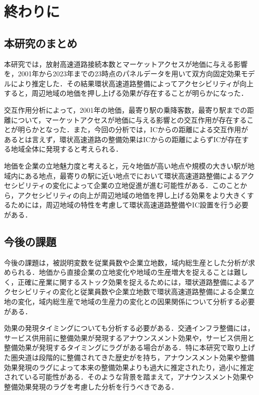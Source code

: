\chapter{終わりに}

\section{本研究のまとめ}
本研究では，放射高速道路接続本数とマーケットアクセスが地価に与える影響を，2001年から2023年までの23時点のパネルデータを用いて双方向固定効果モデルにより推定した．その結果環状高速道路整備によってアクセシビリティが向上すると，周辺地域の地価を押し上げる効果が存在することが明らかになった．

交互作用分析によって，2001年の地価，最寄り駅の乗降客数，最寄り駅までの距離について，マーケットアクセスが地価に与える影響との交互作用が存在することが明らかとなった．また，今回の分析では，ICからの距離による交互作用があるとは言えず，環状高速道路の整備効果はICからの距離によらずICが存在する地域全体に発現すると考えられる．

地価を企業の立地魅力度と考えると，元々地価が高い地点や規模の大きい駅が地域内にある地点，最寄りの駅に近い地点でにおいて環状高速道路整備によるアクセシビリティの変化によって企業の立地促進が進む可能性がある．このことから，アクセシビリティの向上が周辺地域の地価を押し上げる効果をより大きくするためには，周辺地域の特性を考慮して環状高速道路整備やIC設置を行う必要がある．
\section{今後の課題}
今後の課題は，被説明変数を従業員数や企業立地数，域内総生産とした分析が求められる．地価から直接企業の立地変化や地域の生産増大を捉えることは難しく，正確に産業に関するストック効果を捉えるためには，環状道路整備によるアクセシビリティの変化と従業員数や企業立地数で環状高速道路整備による企業立地の変化，域内総生産で地域の生産力の変化との因果関係について分析する必要がある．

効果の発現タイミングについても分析する必要がある．交通インフラ整備には，サービス供用前に整備効果が発現するアナウンスメント効果や，サービス供用と整備効果が発現するタイミングにラグがある場合がある．特に本研究で取り上げた圏央道は段階的に整備されてきた歴史がを持ち，アナウンスメント効果や整備効果発現のラグによって本来の整備効果よりも過大に推定されたり，過小に推定されている可能性がある．そのような背景を踏まえて，アナウンスメント効果や整備効果発現のラグを考慮した分析を行うべきである．

